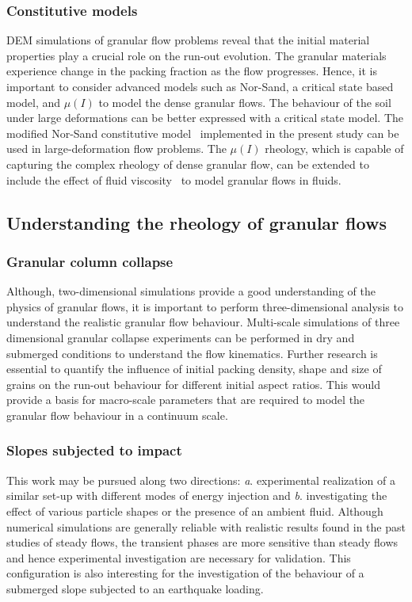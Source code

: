 \subsubsection*{Constitutive models}

DEM simulations of granular flow problems reveal that the initial material 
properties play a crucial role on the run-out evolution. The granular materials 
experience change in the packing fraction as the flow progresses. Hence, it is 
important to consider advanced models such as Nor-Sand, a critical state based 
model, and $\mu(I)$  to model the dense granular flows. The behaviour of the 
soil under large deformations can be better expressed with a critical state 
model. The modified Nor-Sand constitutive model~\citep{Robert2010} implemented 
in the present study can be used in large-deformation flow problems. The 
$\mu(I)$ rheology, which is capable of capturing the complex rheology of dense 
granular flow, can be extended to include the effect of fluid 
viscosity~\citep{Pouliquen2005} to model granular flows in fluids. 


\subsection{Understanding the rheology of granular flows}

\subsubsection*{Granular column collapse}
Although, two-dimensional simulations provide a good understanding of the 
physics of granular flows, it is important to perform three-dimensional 
analysis to understand the realistic granular flow behaviour. Multi-scale 
simulations of three dimensional granular collapse experiments can be performed 
in dry and submerged conditions to understand the flow kinematics. Further 
research is essential to quantify the influence of initial packing density, 
shape and size of grains on the run-out behaviour for different initial aspect 
ratios. This would provide a basis for macro-scale parameters that are required 
to model the granular flow behaviour in a continuum scale.

\subsubsection*{Slopes subjected to impact}
This work may be pursued along two directions: \textit{a}. experimental 
realization of a similar set-up with different modes of energy injection and 
\textit{b}. investigating the effect of various particle shapes or the presence 
of an ambient fluid. Although numerical simulations are generally reliable with 
realistic results found in the past studies of steady flows, the transient 
phases are more sensitive than steady flows and hence experimental 
investigation are necessary for validation. This configuration is also 
interesting for the investigation of the behaviour of a submerged slope 
subjected to an earthquake loading.

